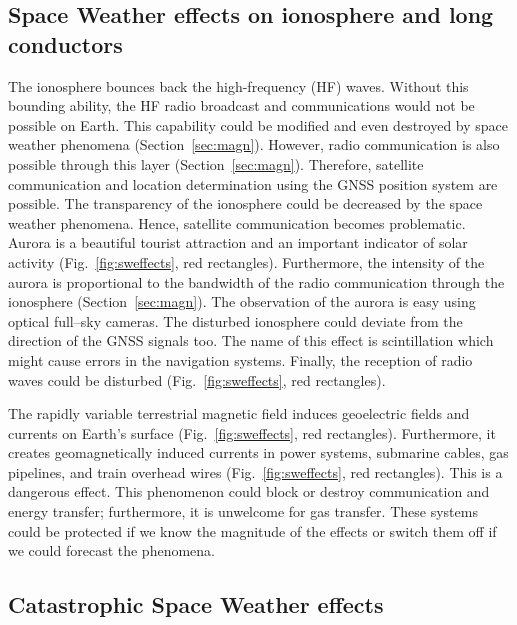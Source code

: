 \documentclass[sn-aps]{sn-jnl}%
\begin{document}
\subsection{Space Weather effects on ionosphere and long conductors}
\label{sec:swgeneral}

The ionosphere bounces back the high-frequency (HF) waves. Without this bounding ability, the HF radio broadcast and communications would not be possible on Earth. This capability could be modified and even destroyed by space weather phenomena (Section~\ref{sec:magn}). However, radio communication is also possible through this layer (Section~\ref{sec:magn}). Therefore, satellite communication and location determination using the GNSS position system are possible. The transparency of the ionosphere could be decreased by the space weather phenomena. Hence, satellite communication becomes problematic. Aurora is a beautiful tourist attraction and an important indicator of solar activity (Fig.~\ref{fig:sweffects}, red rectangles). Furthermore, the intensity of the aurora is proportional to the bandwidth of the radio communication through the ionosphere (Section~\ref{sec:magn}). The observation of the aurora is easy using optical full--sky cameras. The disturbed ionosphere could deviate from the direction of the GNSS signals too. The name of this effect is scintillation which might cause errors in the navigation systems. Finally, the reception of radio waves could be disturbed (Fig.~\ref{fig:sweffects}, red rectangles).

The rapidly variable terrestrial magnetic field induces geoelectric fields and currents on Earth's surface (Fig.~\ref{fig:sweffects}, red rectangles). Furthermore, it creates geomagnetically induced currents in power systems, submarine cables, gas pipelines, and train overhead wires (Fig.~\ref{fig:sweffects}, red rectangles). This is a dangerous effect. This phenomenon could block or destroy communication and energy transfer; furthermore, it is unwelcome for gas transfer. These systems could be protected if we know the magnitude of the effects or switch them off if we could forecast the phenomena. 

\subsection{Catastrophic Space Weather effects}
\label{sec:swcata}
\end{document}
